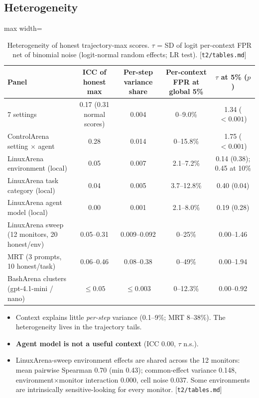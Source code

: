 \documentclass[11pt]{article}
\newcommand{\src}[1]{{\footnotesize\textcolor{ink2}{[\nolinkurl{#1}]}}}
\begin{document}
\subsection{Heterogeneity}
\begin{table}[!htb]\centering\small
\begin{adjustbox}{max width=\linewidth}\begin{tabular}{@{}lcccc@{}}
\toprule
Panel & ICC of honest max & Per-step variance share & Per-context FPR at global 5\% & $\tau$ at 5\% ($p$)\\
\midrule
7 settings & 0.17 (0.31 normal scores) & 0.004 & 0--9.0\% & 1.34 ($<0.001$)\\
ControlArena setting $\times$ agent & 0.28 & 0.014 & 0--15.8\% & 1.75 ($<0.001$)\\
LinuxArena environment (local) & 0.05 & 0.007 & 2.1--7.2\% & 0.14 (0.38); 0.45 at 10\%\\
LinuxArena task category (local) & 0.04 & 0.005 & 3.7--12.8\% & 0.40 (0.04)\\
LinuxArena agent model (local) & 0.00 & 0.001 & 2.1--8.0\% & 0.19 (0.28)\\
LinuxArena sweep (12 monitors, 20 honest/env) & 0.05--0.31 & 0.009--0.092 & 0--25\% & 0.00--1.46\\
MRT (3 prompts, 10 honest/task) & 0.06--0.46 & 0.08--0.38 & 0--49\% & 0.00--1.94\\
BashArena clusters (gpt-4.1-mini / nano) & $\le0.05$ & $\le0.003$ & 0--12.3\% & 0.00--0.92\\
\bottomrule
\end{tabular}\end{adjustbox}
\caption{Heterogeneity of honest trajectory-max scores. $\tau$ = SD of logit per-context FPR net of binomial noise (logit-normal random effects; LR test). \src{t2/tables.md}}
\end{table}
\begin{itemize}
\item Context explains little \emph{per-step} variance (0.1--9\%; MRT 8--38\%). The heterogeneity lives in the trajectory tails.
\item \textbf{Agent model is not a useful context} (ICC 0.00, $\tau$ n.s.).
\item LinuxArena-sweep environment effects are shared across the 12 monitors: mean pairwise Spearman 0.70 (min 0.43); common-effect variance 0.148, environment$\times$monitor interaction 0.000, cell noise 0.037. Some environments are intrinsically sensitive-looking for every monitor. \src{t2/tables.md}
\end{itemize}
\end{document}

